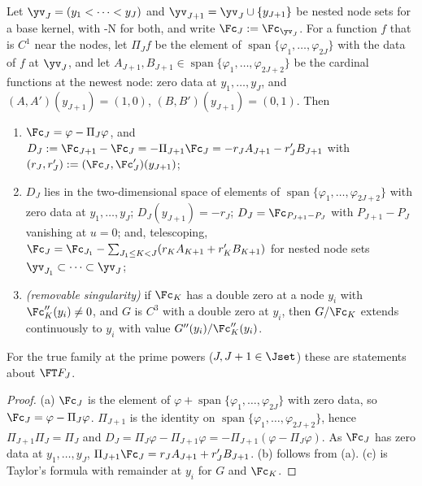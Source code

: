 \begin{lemma}\label{lem:increment}
Let $\yv_J=(y_1<\dots<y_J)$ and $\yv_{J+1}=\yv_J\cup\{y_{J+1}\}$ be nested node sets for a base kernel,
with \hyp{N} for both, and write $\Fc_J:=\Fc_{\yv_J}$. For a function $f$ that is $C^1$ near the nodes, let
$\Pi_Jf$ be the element of $\operatorname{span}\{\varphi_1,\dots,\varphi_{2J}\}$ with the data of $f$ at $\yv_J$, and let
$A_{J+1},B_{J+1}\in\operatorname{span}\{\varphi_1,\dots,\varphi_{2J+2}\}$ be the cardinal functions at the newest node:
zero data at $y_1,\dots,y_J$, and $(A,A')(y_{J+1})=(1,0)$, $(B,B')(y_{J+1})=(0,1)$. Then
\begin{enumerate}[label=(\alph*),leftmargin=2em]
\item $\Fc_J=\varphi-\Pi_J\varphi$, and
$D_J:=\Fc_{J+1}-\Fc_J=-\Pi_{J+1}\Fc_J=-r_JA_{J+1}-r_J'B_{J+1}$ with $(r_J,r_J'):=(\Fc_J,\Fc_J')(y_{J+1})$;
\item $D_J$ lies in the two-dimensional space of elements of $\operatorname{span}\{\varphi_1,\dots,\varphi_{2J+2}\}$ with
zero data at $y_1,\dots,y_J$; $D_J(y_{J+1})=-r_J$; $D_J=\Fc_{P_{J+1}-P_J}$ with $P_{J+1}-P_J$ vanishing at
$u=0$; and, telescoping,
$\Fc_J=\Fc_{J_1}-\sum_{J_1\le K<J}(r_KA_{K+1}+r_K'B_{K+1})$ for nested node sets $\yv_{J_1}\subset\dots\subset\yv_J$;
\item \emph{(removable singularity)} if $\Fc_K$ has a double zero at a node $y_i$ with $\Fc_K''(y_i)\ne0$, and
$G$ is $C^3$ with a double zero at $y_i$, then $G/\Fc_K$ extends continuously to $y_i$ with value
$G''(y_i)/\Fc_K''(y_i)$.
\end{enumerate}
For the true family at the prime powers ($J,J+1\in\Jset$) these are statements about $\FT F_J$.
\end{lemma}

\begin{proof}
(a) $\Fc_J$ is the element of $\varphi+\operatorname{span}\{\varphi_1,\dots,\varphi_{2J}\}$ with zero data, so
$\Fc_J=\varphi-\Pi_J\varphi$. $\Pi_{J+1}$ is the identity on $\operatorname{span}\{\varphi_1,\dots,\varphi_{2J+2}\}$, hence
$\Pi_{J+1}\Pi_J=\Pi_J$ and $D_J=\Pi_J\varphi-\Pi_{J+1}\varphi=-\Pi_{J+1}(\varphi-\Pi_J\varphi)$. As $\Fc_J$ has zero
data at $y_1,\dots,y_J$, $\Pi_{J+1}\Fc_J=r_JA_{J+1}+r_J'B_{J+1}$. (b) follows from (a). (c) is Taylor's
formula with remainder at $y_i$ for $G$ and $\Fc_K$.
\end{proof}

